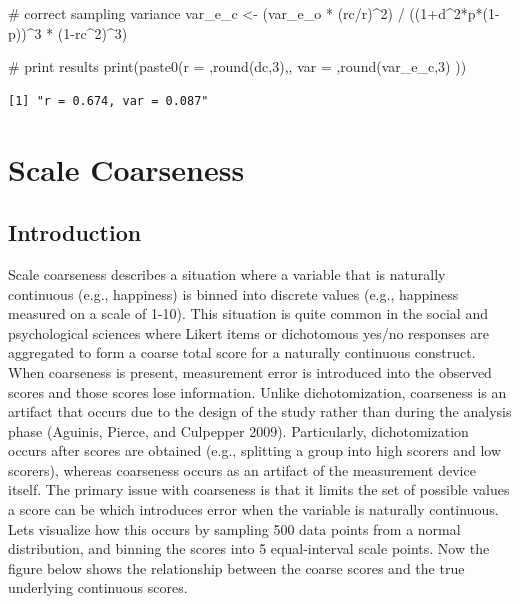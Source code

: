\documentclass[
  letterpaper,
  DIV=11,
  numbers=noendperiod]{scrreprt}
\newenvironment{Shaded}{\begin{snugshade}}{\end{snugshade}}
\newcommand{\CommentTok}[1]{\textcolor[rgb]{0.37,0.37,0.37}{#1}}
\newcommand{\DecValTok}[1]{\textcolor[rgb]{0.68,0.00,0.00}{#1}}
\newcommand{\FunctionTok}[1]{\textcolor[rgb]{0.28,0.35,0.67}{#1}}
\newcommand{\NormalTok}[1]{\textcolor[rgb]{0.00,0.23,0.31}{#1}}
\newcommand{\OtherTok}[1]{\textcolor[rgb]{0.00,0.23,0.31}{#1}}
\newcommand{\SpecialCharTok}[1]{\textcolor[rgb]{0.37,0.37,0.37}{#1}}
\newcommand{\StringTok}[1]{\textcolor[rgb]{0.13,0.47,0.30}{#1}}
\begin{document}
\begin{Shaded}
\begin{Highlighting}[]
\CommentTok{\# correct sampling variance}
\NormalTok{var\_e\_c }\OtherTok{\textless{}{-}}\NormalTok{ (var\_e\_o }\SpecialCharTok{*}\NormalTok{ (rc}\SpecialCharTok{/}\NormalTok{r)}\SpecialCharTok{\^{}}\DecValTok{2}\NormalTok{) }\SpecialCharTok{/}\NormalTok{ ((}\DecValTok{1}\SpecialCharTok{+}\NormalTok{d}\SpecialCharTok{\^{}}\DecValTok{2}\SpecialCharTok{*}\NormalTok{p}\SpecialCharTok{*}\NormalTok{(}\DecValTok{1}\SpecialCharTok{{-}}\NormalTok{p))}\SpecialCharTok{\^{}}\DecValTok{3} \SpecialCharTok{*}\NormalTok{ (}\DecValTok{1}\SpecialCharTok{{-}}\NormalTok{rc}\SpecialCharTok{\^{}}\DecValTok{2}\NormalTok{)}\SpecialCharTok{\^{}}\DecValTok{3}\NormalTok{)}

\CommentTok{\# print results}
\FunctionTok{print}\NormalTok{(}\FunctionTok{paste0}\NormalTok{(}\StringTok{\textquotesingle{}r = \textquotesingle{}}\NormalTok{,}\FunctionTok{round}\NormalTok{(dc,}\DecValTok{3}\NormalTok{),}\StringTok{\textquotesingle{}, var = \textquotesingle{}}\NormalTok{,}\FunctionTok{round}\NormalTok{(var\_e\_c,}\DecValTok{3}\NormalTok{) ))}
\end{Highlighting}
\end{Shaded}

\begin{verbatim}
[1] "r = 0.674, var = 0.087"
\end{verbatim}

\hypertarget{scale-coarseness}{%
\chapter{Scale Coarseness}\label{scale-coarseness}}

\hypertarget{introduction-4}{%
\section{Introduction}\label{introduction-4}}

Scale coarseness describes a situation where a variable that is
naturally continuous (e.g., happiness) is binned into discrete values
(e.g., happiness measured on a scale of 1-10). This situation is quite
common in the social and psychological sciences where Likert items or
dichotomous yes/no responses are aggregated to form a coarse total score
for a naturally continuous construct. When coarseness is present,
measurement error is introduced into the observed scores and those
scores lose information. Unlike dichotomization, coarseness is an
artifact that occurs due to the design of the study rather than during
the analysis phase (Aguinis, Pierce, and Culpepper 2009). Particularly,
dichotomization occurs after scores are obtained (e.g., splitting a
group into high scorers and low scorers), whereas coarseness occurs as
an artifact of the measurement device itself. The primary issue with
coarseness is that it limits the set of possible values a score can be
which introduces error when the variable is naturally continuous. Lets
visualize how this occurs by sampling 500 data points from a normal
distribution, and binning the scores into 5 equal-interval scale points.
Now the figure below shows the relationship between the coarse scores
and the true underlying continuous scores.
\end{document}
